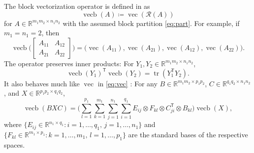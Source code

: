 \documentclass[11pt,reqno]{amsart}
\newcommand{\tp}{{\scriptscriptstyle\mathsf{T}}}
\DeclareMathOperator{\tr}{tr}
\DeclareMathOperator{\vecb}{vecb}
\DeclareMathOperator{\vect}{vec}
\theoremstyle{definition}
\numberwithin{equation}{section}
\newcommand{\R}{\mathbb{R}}
\begin{document}
The block vectorization operator is defined in \cite{kon} as
\[\vecb(A) \coloneqq \vect(\mathcal{R}(A))\]
for $A \in \R^{m_1 m_2 \times n_1 n_2}$ with the assumed block partition \eqref{eq:part}. For example, if $m_1 = n_1 = 2$, then
\[
    \vecb\biggl(\begin{bmatrix}
        A_{11} &A_{12}\\
        A_{21} &A_{22}
    \end{bmatrix}\biggr) = \bigl(
        \vect(A_{11}),
        \vect(A_{21}),
        \vect(A_{12}),
        \vect(A_{22}) \bigr).
\]
The operator preserves inner products: For $Y_1, Y_2 \in \R^{m_1m_2 \times n_1n_2}$, 
\[
\vecb(Y_1)^\tp \vecb(Y_2) = \tr(Y_1^\tp Y_2).
\]
It also behaves much like $\vect$ in \eqref{eq:vec}  \cite[Equation~11]{kon}: For any $B \in \R^{m_1m_2 \times p_1p_2}$, $C \in \R^{q_1q_2 \times n_1n_2}$, and $X \in \R^{p_1p_2 \times q_1q_2}$,
\begin{equation}\label{eq:product-rule}
    \vecb(BXC) = \Biggl(\sum_{l=1}^{p_1}\sum_{k=1}^{m_1}\sum_{j=1}^{n_1}\sum_{i=1}^{q_1} E_{ij} \otimes F_{kl} \otimes C_{ji}^\tp \otimes B_{kl} \Biggr) \vecb(X),
\end{equation}
where $\{ E_{ij}  \in \R^{n_1 \times q_1}: i = 1,\dots,q_1, \, j = 1, \dots, n_1\}$ and $\{ F_{kl} \in \R^{m_1 \times p_1}: k=1, \dots, m_1, \, l = 1,\dots,p_1\}$ are the standard bases of the respective spaces.
\end{document}
